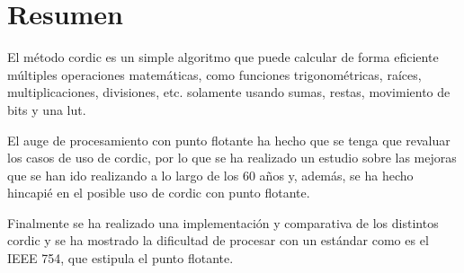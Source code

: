 

\chapter*{Resumen}
\thispagestyle{empty}
El método \gls{cordic} es un simple algoritmo que puede calcular de forma eficiente múltiples operaciones matemáticas, como funciones trigonométricas, raíces, multiplicaciones, divisiones, etc. solamente usando sumas, restas, movimiento de bits y una \gls{lut}.

El auge de procesamiento con punto flotante ha hecho que se tenga que revaluar los casos de uso de \gls{cordic}, por lo que se ha realizado un estudio sobre las mejoras que se han ido realizando a lo largo de los 60 años y, además, se ha hecho hincapié en el posible uso de \gls{cordic} con punto flotante. 

Finalmente se ha realizado una implementación y comparativa de los distintos \gls{cordic} y se ha mostrado la dificultad de procesar con un estándar como es el IEEE 754, que estipula el punto flotante.




\thispagestyle{empty}
\vspace{1cm}




